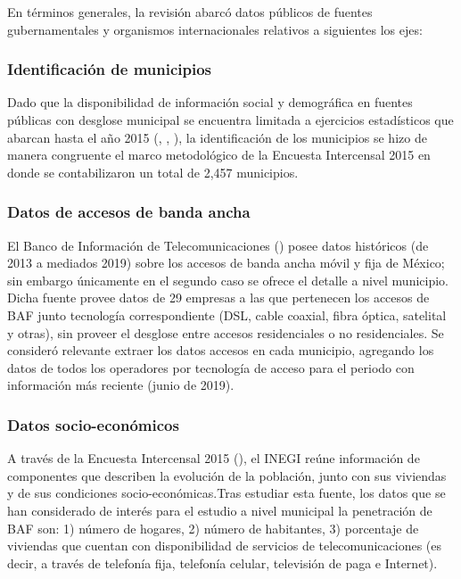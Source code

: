 \documentclass[9pt,twocolumn,twoside]{ilcss}
\begin{document}
En términos generales, la revisión abarcó datos públicos 
de fuentes gubernamentales y organismos internacionales relativos a siguientes los ejes:

\subsubsection{Identificación de municipios}

Dado que la disponibilidad de información social y demográfica en fuentes públicas con desglose municipal se encuentra limitada a ejercicios estadísticos que abarcan hasta el año 2015 (\cite{Intercensal2015}, \cite{CONAPO2015}, \cite{ONU2015}), la identificación de los municipios se hizo de manera congruente el marco metodológico de la Encuesta Intercensal 2015 en donde se contabilizaron un total de 2,457 municipios.

\subsubsection{Datos de accesos de banda ancha}

El Banco de Información de Telecomunicaciones (\cite{IFT2019BIT}) posee datos históricos (de 2013 a mediados 2019) sobre los accesos de banda ancha móvil y fija de México; sin embargo únicamente en el segundo caso se ofrece el detalle a nivel municipio. Dicha fuente provee datos de 29 empresas a las que pertenecen los accesos de BAF junto tecnología correspondiente (DSL, cable coaxial, fibra óptica, satelital y otras), sin proveer el desglose entre accesos residenciales o no residenciales. Se consideró relevante extraer los datos accesos en cada municipio, agregando los datos de todos los operadores por tecnología de acceso para el periodo con información más reciente (junio de 2019).

\subsubsection{Datos socio-económicos}
A través de la Encuesta Intercensal 2015 (\cite{Intercensal2015}), el INEGI reúne información de componentes que describen la evolución de la población, junto con sus viviendas y de sus condiciones socio-económicas.Tras estudiar esta fuente, los datos que se han considerado de interés para el estudio a nivel municipal la penetración de BAF son: 1) número de hogares, 2) número de habitantes, 3) porcentaje de viviendas que cuentan con disponibilidad de servicios de telecomunicaciones (es decir, a través de telefonía fija, telefonía celular, televisión de paga e Internet). 
\end{document}
